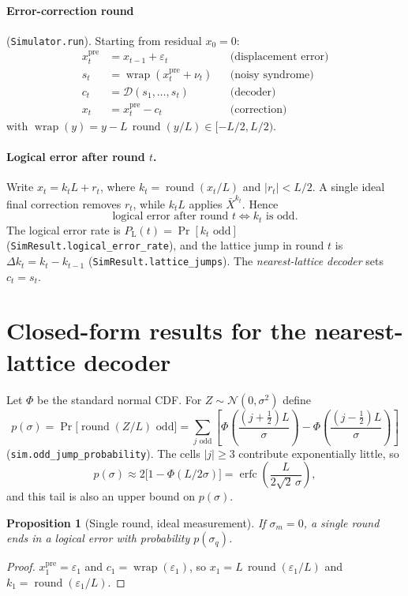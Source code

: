 \documentclass[11pt,letterpaper]{article}
\newtheorem{proposition}{Proposition}
\DeclareMathOperator{\wrap}{wrap}
\DeclareMathOperator{\rnd}{round}
\DeclareMathOperator{\erfc}{erfc}
\newcommand{\PL}{P_{\mathrm{L}}}
\newcommand{\xpre}{x^{\mathrm{pre}}}
\begin{document}
\paragraph{Error-correction round} (\texttt{Simulator.run}).
Starting from residual $x_0=0$:
\begin{align*}
  \xpre_t &= x_{t-1}+\varepsilon_t && \text{(displacement error)}\\
  s_t &= \wrap(\xpre_t+\nu_t) && \text{(noisy syndrome)}\\
  c_t &= \mathcal D(s_1,\dots,s_t) && \text{(decoder)}\\
  x_t &= \xpre_t-c_t && \text{(correction)}
\end{align*}
with $\wrap(y)=y-L\,\rnd(y/L)\in[-L/2,L/2)$.

\paragraph{Logical error after round $t$.}
Write $x_t=k_tL+r_t$, where $k_t=\rnd(x_t/L)$ and $|r_t|<L/2$. A single ideal
final correction removes $r_t$, while $k_tL$ applies $\bar X^{k_t}$. Hence
\[
  \text{logical error after round } t \iff k_t \text{ is odd}.
\]
The logical error rate is $\PL(t)=\Pr[k_t\text{ odd}]$
(\texttt{SimResult.logical\_error\_rate}), and the lattice jump in round $t$ is
$\Delta k_t=k_t-k_{t-1}$ (\texttt{SimResult.lattice\_jumps}).
The \emph{nearest-lattice decoder} sets $c_t=s_t$.

\section{Closed-form results for the nearest-lattice decoder}

Let $\Phi$ be the standard normal CDF. For $Z\sim\mathcal N(0,\sigma^2)$
define
\begin{equation}
  \boxed{\;
  p(\sigma)=\Pr\bigl[\rnd(Z/L)\text{ odd}\bigr]
  =\sum_{j\text{ odd}}\left[
     \Phi\!\left(\frac{(j+\tfrac12)L}{\sigma}\right)
    -\Phi\!\left(\frac{(j-\tfrac12)L}{\sigma}\right)\right]
  \;}
  \tag{P}\label{eq:P}
\end{equation}
(\texttt{sim.odd\_jump\_probability}). The cells $|j|\ge3$ contribute
exponentially little, so
\[
  p(\sigma)\approx 2\bigl[1-\Phi(L/2\sigma)\bigr]
  =\erfc\!\left(\frac{L}{2\sqrt2\,\sigma}\right),
\]
and this tail is also an upper bound on $p(\sigma)$.

\begin{proposition}[Single round, ideal measurement]\label{prop:single}
If $\sigma_m=0$, a single round ends in a logical error with probability
$p(\sigma_q)$.
\end{proposition}
\begin{proof}
$\xpre_1=\varepsilon_1$ and $c_1=\wrap(\varepsilon_1)$, so
$x_1=L\,\rnd(\varepsilon_1/L)$ and $k_1=\rnd(\varepsilon_1/L)$.
\end{proof}
\end{document}
